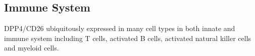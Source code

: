 \subsection{Immune System}
DPP4/CD26 ubiquitously expressed in many cell types in both innate and immune system including T cells, activated B cells, activated natural killer cells and myeloid cells. 